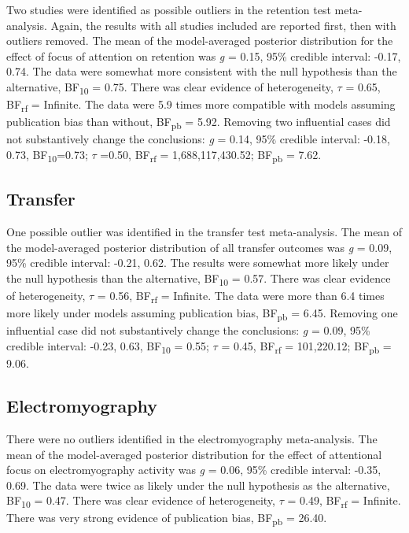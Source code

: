 \documentclass[
  man, donotrepeattitle,floatsintext]{apa7}
\begin{document}
Two studies were identified as possible outliers in the retention test meta-analysis. Again, the results with all studies included are reported first, then with outliers removed. The mean of the model-averaged posterior distribution for the effect of focus of attention on retention was \emph{g} = 0.15, 95\% credible interval: -0.17, 0.74. The data were somewhat more consistent with the null hypothesis than the alternative, BF\textsubscript{10} = 0.75. There was clear evidence of heterogeneity, \(\tau\) = 0.65, BF\textsubscript{rf} = Infinite. The data were 5.9 times more compatible with models assuming publication bias than without, BF\textsubscript{pb} = 5.92. Removing two influential cases did not substantively change the conclusions: \emph{g} = 0.14, 95\% credible interval: -0.18, 0.73, BF\textsubscript{10}=0.73; \(\tau\) =0.50, BF\textsubscript{rf} = 1,688,117,430.52; BF\textsubscript{pb} = 7.62.

\hypertarget{transfer}{%
\subsection{Transfer}\label{transfer}}

One possible outlier was identified in the transfer test meta-analysis. The mean of the model-averaged posterior distribution of all transfer outcomes was \emph{g} = 0.09, 95\% credible interval: -0.21, 0.62. The results were somewhat more likely under the null hypothesis than the alternative, BF\textsubscript{10} = 0.57. There was clear evidence of heterogeneity, \(\tau\) = 0.56, BF\textsubscript{rf} = Infinite. The data were more than 6.4 times more likely under models assuming publication bias, BF\textsubscript{pb} = 6.45. Removing one influential case did not substantively change the conclusions: \emph{g} = 0.09, 95\% credible interval: -0.23, 0.63, BF\textsubscript{10} = 0.55; \(\tau\) = 0.45, BF\textsubscript{rf} = 101,220.12; BF\textsubscript{pb} = 9.06.

\hypertarget{electromyography}{%
\subsection{Electromyography}\label{electromyography}}

There were no outliers identified in the electromyography meta-analysis. The mean of the model-averaged posterior distribution for the effect of attentional focus on electromyography activity was \emph{g} = 0.06, 95\% credible interval: -0.35, 0.69. The data were twice as likely under the null hypothesis as the alternative, BF\textsubscript{10} = 0.47. There was clear evidence of heterogeneity, \(\tau\) = 0.49, BF\textsubscript{rf} = Infinite. There was very strong evidence of publication bias, BF\textsubscript{pb} = 26.40.
\end{document}
